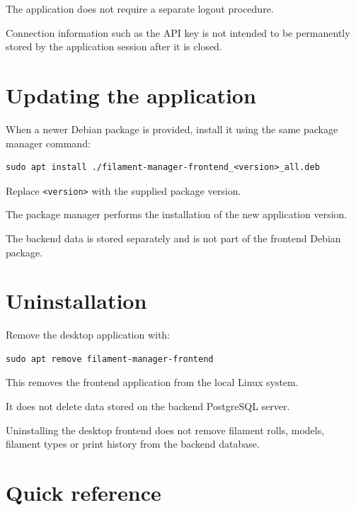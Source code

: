 \documentclass[a4paper,11pt]{article}
\begin{document}
The application does not require a separate logout procedure.

Connection information such as the API key is not intended to be permanently
stored by the application session after it is closed.

\section{Updating the application}

When a newer Debian package is provided, install it using the same package
manager command:

\begin{lstlisting}
sudo apt install ./filament-manager-frontend_<version>_all.deb
\end{lstlisting}

Replace \texttt{<version>} with the supplied package version.

The package manager performs the installation of the new application version.

The backend data is stored separately and is not part of the frontend Debian
package.

\section{Uninstallation}

Remove the desktop application with:

\begin{lstlisting}
sudo apt remove filament-manager-frontend
\end{lstlisting}

This removes the frontend application from the local Linux system.

It does not delete data stored on the backend PostgreSQL server.

\begin{warnbox}
Uninstalling the desktop frontend does not remove filament rolls, models,
filament types or print history from the backend database.
\end{warnbox}

\section{Quick reference}
\end{document}
